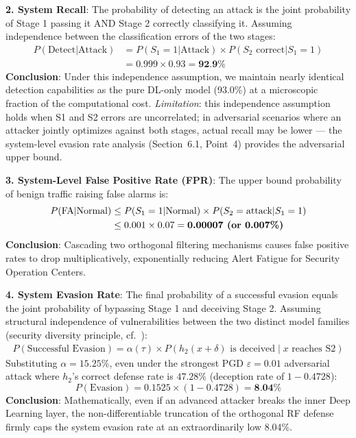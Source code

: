\documentclass[sigconf]{acmart}
\begin{document}
\textbf{2. System Recall}: The probability of detecting an attack is the joint probability of Stage 1 passing it AND Stage 2 correctly classifying it. Assuming independence between the classification errors of the two stages:
\begin{align*}
P(\text{Detect}|\text{Attack}) &= P(S_1=1|\text{Attack}) \times P(S_2 \text{ correct}|S_1=1) \\
                               &= 0.999 \times 0.93 = \textbf{92.9\%}
\end{align*}
\textbf{Conclusion}: Under this independence assumption, we maintain nearly identical detection capabilities as the pure DL-only model (93.0\%) at a microscopic fraction of the computational cost. \emph{Limitation}: this independence assumption holds when S1 and S2 errors are uncorrelated; in adversarial scenarios where an attacker jointly optimizes against both stages, actual recall may be lower --- the system-level evasion rate analysis (Section~6.1, Point~4) provides the adversarial upper bound.

\textbf{3. System-Level False Positive Rate (FPR)}: The upper bound probability of benign traffic raising false alarms is:
\begin{align*}
P(\text{FA}|\text{Normal}) &\leq P(S_1=1|\text{Normal}) \times P(S_2=\text{attack}|S_1=1) \\
                           &\leq 0.001 \times 0.07 = \textbf{0.00007\ \text{(or 0.007\%)}}
\end{align*}
\textbf{Conclusion}: Cascading two orthogonal filtering mechanisms causes false positive rates to drop multiplicatively, exponentially reducing Alert Fatigue for Security Operation Centers.

\textbf{4. System Evasion Rate}: The final probability of a successful evasion equals the joint probability of bypassing Stage 1 and deceiving Stage 2. Assuming structural independence of vulnerabilities between the two distinct model families (security diversity principle, cf.\ \cite{22}):
\begin{align*}
P(\text{Successful Evasion}) = \alpha(\tau) \times P(h_2(x+\delta) \text{ is deceived} \mid x \text{ reaches S2})
\end{align*}
Substituting $\alpha=15.25\%$, even under the strongest PGD $\varepsilon=0.01$ adversarial attack where $h_2$'s correct defense rate is $47.28\%$ (deception rate of $1 - 0.4728$):
$$ P(\text{Evasion}) = 0.1525 \times (1 - 0.4728) = \textbf{8.04\%} $$
\textbf{Conclusion}: Mathematically, even if an advanced attacker breaks the inner Deep Learning layer, the non-differentiable truncation of the orthogonal RF defense firmly caps the system evasion rate at an extraordinarily low 8.04\%.
\end{document}
